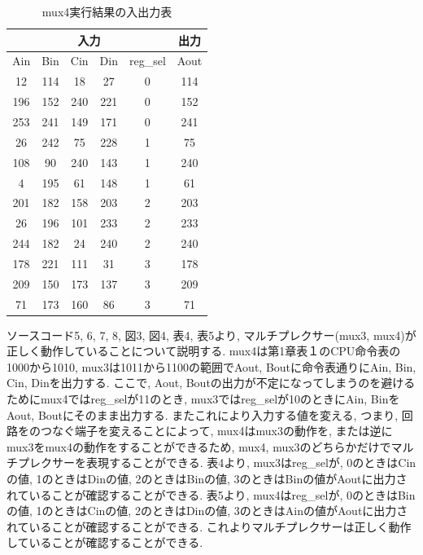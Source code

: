\documentclass[12pt]{jreport}
\begin{document}
            \begin{table}[htb]
              \begin{center}
                \caption{mux4実行結果の入出力表}
                \begin{tabular} {|c|c|c|c|c|c|} \hline
                  \multicolumn{5}{|c|}{入力} & 出力 \\ \hline \hline
                        Ain & Bin & Cin & Din & reg\_sel & Aout \\ \hline
                        12 & 114 & 18 & 27 & 0 & 114 \\ \hline
                        196 & 152 & 240 & 221 & 0 & 152 \\ \hline
                        253 & 241 & 149 & 171 & 0 & 241 \\ \hline

                        26 & 242 & 75 & 228 & 1 & 75 \\ \hline
                        108 & 90 & 240 & 143 & 1 & 240 \\ \hline
                        4 &  195 & 61 & 148 & 1 & 61 \\ \hline

                        201 & 182 & 158 & 203 & 2 & 203 \\ \hline
                        26 & 196 & 101 & 233 & 2 & 233 \\ \hline
                        244 & 182 & 24 & 240 & 2 & 240 \\ \hline

                        178 & 221 & 111 & 31 & 3 & 178 \\ \hline
                        209 & 150 & 173 & 137 & 3 & 209 \\ \hline
                        71 & 173 & 160 & 86 & 3 & 71 \\ \hline

                \end{tabular}
              \end{center}
            \end{table}

            ソースコード5, 6, 7, 8, 図3, 図4, 表4, 表5より, マルチプレクサー(mux3, mux4)が正しく動作していることについて説明する. 
            mux4は第1章表１のCPU命令表の1000から1010, mux3は1011から1100の範囲でAout, Boutに命令表通りにAin, Bin, Cin, Dinを出力する. ここで, Aout, Boutの出力が不定になってしまうのを避けるためにmux4ではreg\_selが11のとき, mux3ではreg\_selが10のときにAin, BinをAout, Boutにそのまま出力する. またこれにより入力する値を変える, つまり, 回路をのつなぐ端子を変えることによって, mux4はmux3の動作を, または逆にmux3をmux4の動作をすることができるため, mux4, mux3のどちらかだけでマルチプレクサーを表現することができる. 表4より, mux3はreg\_selが, 0のときはCinの値, 1のときはDinの値, 2のときはBinの値, 3のときはBinの値がAoutに出力されていることが確認することができる. 表5より, mux4はreg\_selが, 0のときはBinの値, 1のときはCinの値, 2のときはDinの値, 3のときはAinの値がAoutに出力されていることが確認することができる. これよりマルチプレクサーは正しく動作していることが確認することができる. 
\end{document}
